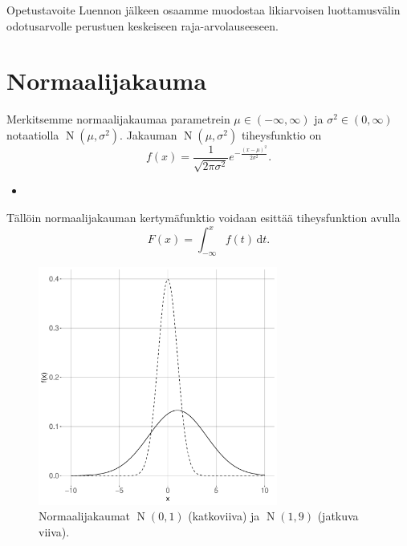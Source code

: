 \documentclass{beamer}
\DeclareMathOperator{\n}{\mathrm N}
\begin{document}

\begin{frame}{Opetustavoite}
  Luennon jälkeen osaamme muodostaa likiarvoisen luottamusvälin odotusarvolle
  perustuen keskeiseen raja-arvolauseeseen.
\end{frame}


\section{Normaalijakauma}

\begin{frame}
  Merkitsemme normaalijakaumaa parametrein $\mu\in(-\infty, \infty)$ ja
  $\sigma^2\in(0,\infty)$ notaatiolla $\n\left(\mu, \sigma^2\right)$. Jakauman
  $\n\left(\mu, \sigma^2\right)$ tiheysfunktio on
  \begin{equation*}
    f(x) = \frac{1}{\sqrt{2\pi\sigma^2}} e^{-\frac{\left(x-\mu\right)^2}
    {2\sigma^2}}.
  \end{equation*}
  \pause
  \begin{itemize}
    \item[]
  \end{itemize}
  Tällöin normaalijakauman kertymäfunktio voidaan esittää tiheysfunktion avulla
  \begin{equation*}
    F\left(x\right) = \int_{-\infty}^{x} f(t)\,\mathrm{d}t.
  \end{equation*}
\end{frame}


\begin{frame}
  \begin{center}
    \begin{figure}
      \includegraphics[width=0.7\textwidth, height=0.7\textwidth]{normal}
      \caption{Normaalijakaumat $\n\left(0,1\right)$ (katkoviiva) ja $\n\left(1, 9\right)$ (jatkuva viiva).}
    \end{figure}
  \end{center}
\end{frame}
\end{document}
